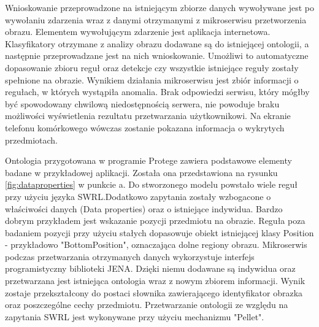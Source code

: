 {{Wnioskowanie przeprowadzone na istniejącym zbiorze danych wywoływane jest po wywołaniu zdarzenia wraz z danymi otrzymanymi z mikroserwisu przetworzenia obrazu. Elementem wywołującym zdarzenie jest aplikacja internetowa. Klasyfikatory otrzymane z analizy obrazu dodawane są do istniejącej ontologii, a następnie przeprowadzane jest na nich wnioskowanie. Umożliwi to automatyczne dopasowanie zbioru reguł oraz detekcje czy wszystkie istniejące reguły zostały spełnione na obrazie. Wynikiem działania mikroserwisu jest zbiór informacji o regułach, w których wystąpiła anomalia. Brak odpowiedzi serwisu, który mógłby być spowodowany chwilową niedostępnością serwera, nie powoduje braku możliwości wyświetlenia rezultatu przetwarzania użytkownikowi. Na ekranie telefonu komórkowego wówczas zostanie pokazana informacja o wykrytych przedmiotach. 

Ontologia przygotowana w programie Protege zawiera podstawowe elementy badane w przykładowej aplikacji. Została ona przedstawiona na rysunku \ref{fig:dataproperties} w punkcie a. Do stworzonego modelu powstało wiele reguł przy użyciu języka SWRL.Dodatkowo zapytania zostały wzbogacone o właściwości danych (Data properties) oraz o istniejące indywidua. Bardzo dobrym przykładem jest wskazanie pozycji przedmiotu na obrazie. Reguła poza badaniem pozycji przy użyciu stałych dopasowuje obiekt istniejącej klasy Position - przykładowo "BottomPosition", oznaczająca dolne regiony obrazu. Mikroserwis podczas przetwarzania otrzymanych danych wykorzystuje interfejs programistyczny biblioteki JENA. Dzięki niemu dodawane są indywidua oraz przetwarzana jest istniejąca ontologia wraz z nowym zbiorem informacji. Wynik zostaje przekształcony do postaci słownika zawierającego identyfikator obrazka oraz poszczególne cechy przedmiotu. Przetwarzanie ontologii ze względu na zapytania SWRL jest wykonywane przy użyciu mechanizmu "Pellet".

}}
